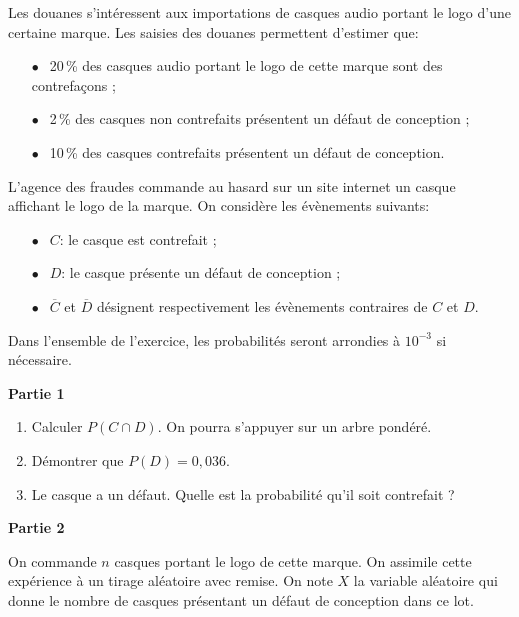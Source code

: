 \medskip

Les douanes s'intéressent aux importations de casques audio portant le logo d'une certaine marque. Les saisies des douanes permettent d'estimer que:

\setlength\parindent{10mm}
\begin{itemize}
	\item[$\bullet~~$] 20\,\% des casques audio portant le logo de cette marque sont des contrefaçons ;
	\item[$\bullet~~$] 2\,\% des casques non contrefaits présentent un défaut de conception ;\item[$\bullet~~$] 10\,\% des casques contrefaits présentent un défaut de conception.
\end{itemize}
\setlength\parindent{0mm}

L'agence des fraudes commande au hasard sur un site internet un casque affichant le logo de la marque. On considère les évènements suivants:

\setlength\parindent{10mm}
\begin{itemize}
	\item[$\bullet~~$] $C$: \og le casque est contrefait \fg{} ;
	\item[$\bullet~~$] $D$: \og le casque présente un défaut de conception \fg{} ;
	\item[$\bullet~~$] $\overline{C}$ et $\overline{D}$ désignent respectivement les évènements contraires de $C$ et $D$.
\end{itemize}
\setlength\parindent{0mm}

Dans l'ensemble de l'exercice, les probabilités seront arrondies à $10^{-3}$ si nécessaire.

\bigskip

\textbf{Partie 1}

\medskip

\begin{enumerate}
	\item Calculer $P(C \cap D)$. On pourra s'appuyer sur un arbre pondéré.
	\item Démontrer que $P(D) = 0,036$.
	\item Le casque a un défaut. Quelle est la probabilité qu'il soit contrefait ?
\end{enumerate}

\bigskip

\textbf{Partie 2}

\medskip

On commande $n$ casques portant le logo de cette marque. On assimile cette expérience à
un tirage aléatoire avec remise. On note $X$ la variable aléatoire qui donne le nombre de casques présentant un défaut de conception dans ce lot.

